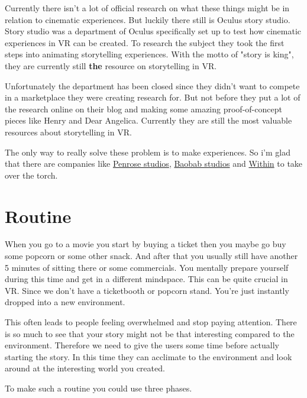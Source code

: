 \documentclass{report}
\begin{document}
				Currently there isn't a lot of official research on what these things might be in relation to cinematic experiences. But luckily there still is Oculus story studio. Story studio was a department of Oculus specifically set up to test how cinematic experiences in VR can be created. To research the subject they took the first steps into animating storytelling experiences. With the motto of "story is king", they are currently still \textbf{the} resource on storytelling in VR. 
				
				Unfortunately the department has been closed since they didn't want to compete in a marketplace they were creating research for. But not before they put a lot of the research online on their blog and making some amazing proof-of-concept pieces like Henry and Dear Angelica. Currently they are still the most valuable resources about storytelling in VR.
				
				The only way to really solve these problem is to make experiences. So i'm glad that there are companies like \href{http://www.penrosestudios.com/}{Penrose studios}, \href{http://www.baobabstudios.com/}{Baobab studios} and \href{https://with.in/}{Within} to take over the torch.

				\section{Routine}\label{chap:Routine}
				
				When you go to a movie you start by buying a ticket then you maybe go buy some popcorn or some other snack. And after that you usually still have another 5 minutes of sitting there or some commercials. You mentally prepare yourself during this time and get in a different mindspace. This can be quite crucial in VR. Since we don't have a ticketbooth or popcorn stand. You're just instantly dropped into a new environment. 
				
				This often leads to people feeling overwhelmed and stop paying attention. There is so much to see that your story might not be that interesting compared to the environment. Therefore we need to give the users some time before actually starting the story. In this time they can acclimate to the environment and look around at the interesting world you created.
				
				To make such a routine you could use three phases.
				
\end{document}
